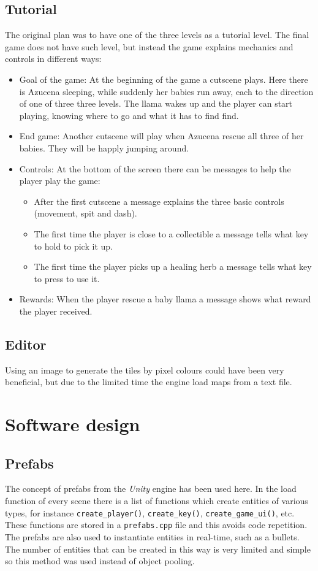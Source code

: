 \documentclass[10pt, a4paper]{article}
\begin{document}
    \subsection{Tutorial}
    The original plan was to have one of the three levels as a tutorial level. The final game does not have such level, but instead the game explains mechanics and controls in different ways:
    \begin{itemize}
    	\item Goal of the game: At the beginning of the game a cutscene plays. Here there is Azucena sleeping, while suddenly her babies run away, each to the direction of one of three three levels. The llama wakes up and the player can start playing, knowing where to go and what it has to find find.
    	\item End game: Another cutscene will play when Azucena rescue all three of her babies. They will be happly jumping around. 
    	\item Controls: At the bottom of the screen there can be messages to help the player play the game:
    	\begin{itemize}
    		\item After the first cutscene a message explains the three basic controls (movement, spit and dash).
    		\item The first time the player is close to a collectible a message tells what key to hold to pick it up.
    		\item The first time the player picks up a healing herb a message tells what key to press to use it.
    	\end{itemize}
    	\item Rewards: When the player rescue a baby llama a message shows what reward the player received.
    \end{itemize}
    
    \subsection{Editor}
    Using an image to generate the tiles by pixel colours could have been very beneficial, but due to the limited time the engine load maps from a text file.
    
    \section{Software design}
    
    \subsection{Prefabs}
    The concept of prefabs from the \textit{Unity} engine has been used here. In the load function of every scene there is a list of functions which create entities of various types, for instance \texttt{create\_player()}, \texttt{create\_key()}, \texttt{create\_game\_ui()}, etc. These functions are stored in a \texttt{prefabs.cpp} file and this avoids code repetition.\\
    The prefabs are also used to instantiate entities in real-time, such as a bullets. The number of entities that can be created in this way is very limited and simple so this method was used instead of object pooling.
    
\end{document}
